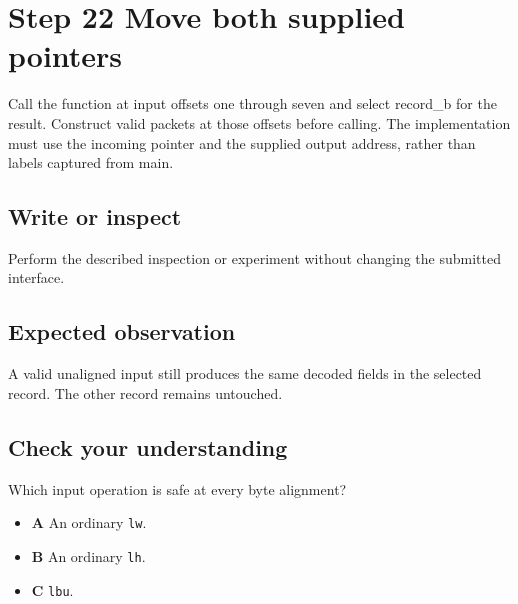 \section{Step 22 Move both supplied pointers}\label{packet-s22}

Call the function at input offsets one through seven and select record\_b for the result. Construct valid packets at those offsets before calling. The implementation must use the incoming pointer and the supplied output address, rather than labels captured from main.

\subsection{Write or inspect}
Perform the described inspection or experiment without changing the submitted interface.

\subsection{Expected observation}
A valid unaligned input still produces the same decoded fields in the selected record. The other record remains untouched.

\subsection{Check your understanding}
Which input operation is safe at every byte alignment?

\begin{itemize}
  \item \textbf{A} An ordinary \texttt{lw}.
  \item \textbf{B} An ordinary \texttt{lh}.
  \item \textbf{C} \texttt{lbu}.
\end{itemize}
